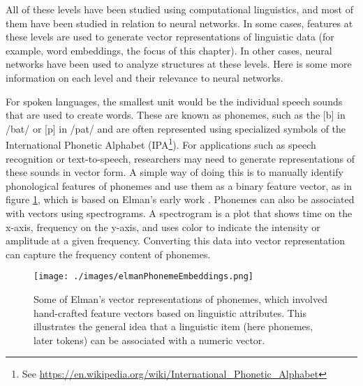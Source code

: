 All of these levels have been studied using computational linguistics, and most of them have been studied in relation to neural networks. In some cases, features at these levels are used to generate vector representations of linguistic data (for example, word embeddings, the focus of this chapter). In other cases, neural networks have been used to analyze structures at these levels. Here is some more information on each level and their relevance to neural networks.

For spoken languages, the smallest unit would be the individual speech sounds that are used to create words. These are known as phonemes, such as the [b] in /bat/ or [p] in /pat/ and are often represented using specialized symbols of the International Phonetic Alphabet (IPA\footnote{See \url{https://en.wikipedia.org/wiki/International_Phonetic_Alphabet}}). For applications such as speech recognition or text-to-speech, researchers may need to generate representations of these sounds in vector form. A simple way of doing this is to manually identify phonological features of phonemes and use them as a binary feature vector, as in figure \ref{elmanWordEmbeddings}, which is based on Elman's early work \cite{elman1990finding}. Phonemes can also be associated with vectors using spectrograms. A spectrogram is a plot that shows time on the x-axis, frequency on the y-axis, and uses color to indicate the intensity or amplitude at a given frequency. Converting this data into vector representation can capture the frequency content of phonemes.

\begin{figure}[h]
\centering
\texttt{[image: ./images/elmanPhonemeEmbeddings.png]}
\caption[From \cite{elman1990finding}.]{Some of Elman's vector representations of phonemes, which involved hand-crafted feature vectors based on linguistic attributes. This illustrates the general idea that a linguistic item (here phonemes, later tokens) can be associated with a numeric vector. }
\label{elmanWordEmbeddings}
\end{figure}

